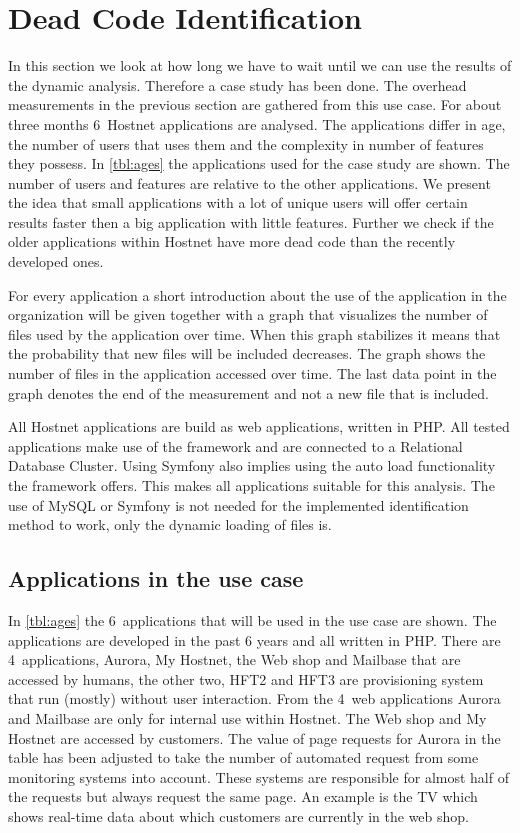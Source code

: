 \clearpage
\section{Dead Code Identification}

In this section we look at how long we have to wait until we can use the results of the dynamic analysis. Therefore a case study has been done. The overhead measurements in the previous section are gathered from this use case. For about three months 6~Hostnet applications are analysed. The applications differ in age, the number of users that uses them and  the complexity in number of features they possess. In \autoref{tbl:ages} the applications used for the case study are shown. The number of users and features are relative to the other applications. We present the idea that small applications with a lot of unique users will offer certain results faster then a big application with little features. Further we check if the older applications within Hostnet have more dead code than the recently developed ones.

For every application a short introduction about the use of the application in the organization will be given together with a graph that visualizes the number of files used by the application over time. When this graph stabilizes it means that the probability that new files will be included decreases. The graph shows the number of files in the application accessed over time. The last data point in the graph denotes the end of the measurement and not a new file that is included.

All Hostnet applications are build as web applications, written in PHP. All tested applications make use of the  framework and are connected to a  Relational Database Cluster. Using Symfony also implies using the auto load functionality the framework offers. This makes all applications suitable for this analysis. The use of MySQL or Symfony is not needed for the implemented identification method to work, only the dynamic loading of files is.

\subsection*{Applications in the use case}
In \autoref{tbl:ages} the 6~applications that will be used in the use case are shown. The applications are developed in the past 6 years and all written in PHP. There are 4~applications, Aurora, My Hostnet, the Web shop and Mailbase that are accessed by humans, the other two, HFT2 and HFT3 are provisioning system that run (mostly) without user interaction. From the 4~web applications Aurora and Mailbase are only for internal use within Hostnet. The Web shop and My Hostnet are accessed by customers. The value of page requests for Aurora in the table has been adjusted to take the number of automated request from some monitoring systems into account. These systems are responsible for almost half of the requests but always request the same page. An example is the TV which shows real-time data about which customers are currently in the web shop.

